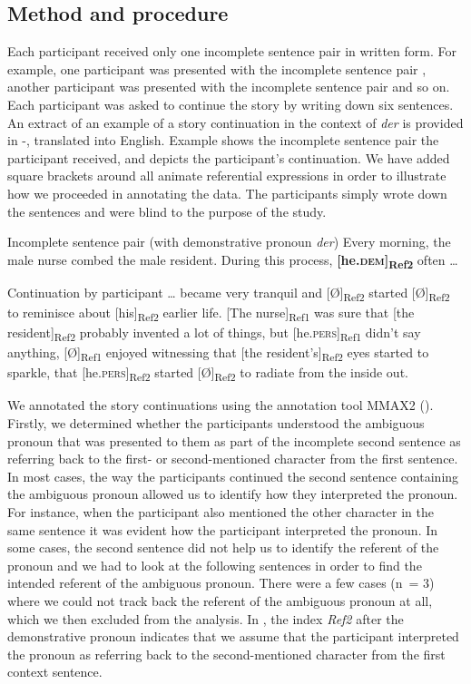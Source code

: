 \documentclass[output=paper,colorlinks,citecolor=brown]{langscibook}
\begin{document}
\subsection{Method and procedure}\label{sec:fuchs:2.3}

Each participant received only one incomplete sentence pair in written form. For example, one participant was presented with the incomplete sentence pair , another participant was presented with the incomplete sentence pair  and so on. Each participant was asked to continue the story by writing down six sentences. An extract of an example of a story continuation in the context of \textit{der} is provided in -, translated into English. Example  shows the incomplete sentence pair the participant received, and  depicts the participant’s continuation. We have added square brackets around all animate referential expressions in order to illustrate how we proceeded in annotating the data. The participants simply wrote down the sentences and were blind to the purpose of the study. 

\ea\label{ex:fuchs:4}{Incomplete sentence pair (with demonstrative pronoun \textit{der})}
\glt Every morning, the male nurse combed the male resident. During this process, \textbf{[he.\textsc{dem}]}\textbf{\textsubscript{Ref2}} often …
\z

\ea\label{ex:fuchs:5} {Continuation by participant}
\glt … became very tranquil and [Ø]\textsubscript{Ref2} started [Ø]\textsubscript{Ref2} to reminisce about [his]\textsubscript{Ref2} earlier life. [The nurse]\textsubscript{Ref1} was sure that [the resident]\textsubscript{Ref2} probably invented a lot of things, but [he.\textsc{pers}]\textsubscript{Ref1} didn’t say anything, [Ø]\textsubscript{Ref1} enjoyed witnessing that [the resident’s]\textsubscript{Ref2} eyes started to sparkle, that [he.\textsc{pers}]\textsubscript{Ref2} started [Ø]\textsubscript{Ref2} to radiate from the inside out.
\z

We annotated the story continuations using the annotation tool MMAX2 (\citealt{MüllerStrube2006}). Firstly, we determined whether the participants understood the ambiguous pronoun that was presented to them as part of the incomplete second sentence as referring back to the first- or second-mentioned character from the first sentence. In most cases, the way the participants continued the second sentence containing the ambiguous pronoun allowed us to identify how they interpreted the pronoun. For instance, when the participant also mentioned the other character in the same sentence it was evident how the participant interpreted the pronoun. In some cases, the second sentence did not help us to identify the referent of the pronoun and we had to look at the following sentences in order to find the intended referent of the ambiguous pronoun. There were a few cases (n~= 3) where we could not track back the referent of the ambiguous pronoun at all, which we then excluded from the analysis. In , the index \textit{Ref2} after the demonstrative pronoun indicates that we assume that the participant interpreted the pronoun as referring back to the second-mentioned character from the first context sentence.
\end{document}
